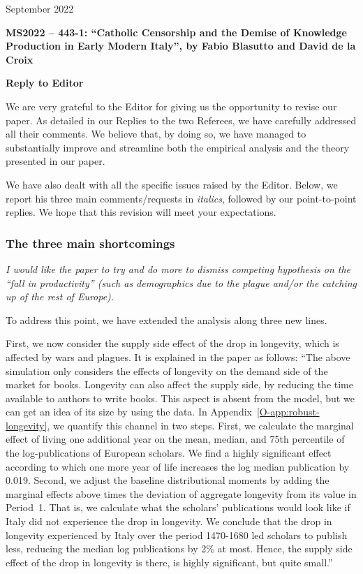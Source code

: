 \documentclass[12pt]{article}
\begin{document}
\hfill September 2022

\textbf{MS2022 – 443-1: “Catholic Censorship and the Demise of Knowledge Production in
Early Modern Italy”, by Fabio Blasutto and David de la Croix}


\textbf{Reply to Editor}

We are very grateful to the Editor for giving us the opportunity to revise our paper.
As detailed in our Replies to the two Referees, we have carefully addressed all their comments. We believe that, by doing so, we have managed to substantially improve and streamline both the empirical analysis and the theory presented in our paper.

We have also dealt with all the specific issues raised by the Editor. Below, we report his three main comments/requests in \emph{italics}, followed by our point-to-point replies.
We hope that this revision will meet your expectations.

\subsubsection*{The three main shortcomings}

\textit{I
would like the paper to try and do more to dismiss competing hypothesis on the “fall in
productivity” (such as demographics due to the plague and/or the catching up of the rest
of Europe).}

To address this point, we have extended the analysis along three new lines. 

First, we now consider the supply side effect of the drop in longevity, which is affected by wars and plagues. It is explained in the paper as follows:
``The above simulation only considers the effects of longevity on the demand side of the market for books. Longevity can also affect the supply side, by reducing the time available to authors to write books. This aspect is absent from the model, but we can get an idea of its size by using the data. In Appendix~\ref{O-app:robust-longevity}, we quantify this channel  in two steps. First, we calculate the marginal effect of living one additional year on the mean, median, and 75th percentile of the log-publications of European scholars. We find a highly significant effect according to which one more year of life increases the log median publication by 0.019.
Second, we adjust the baseline distributional moments by adding the marginal effects above times the deviation of aggregate longevity from its value in Period~1.
That is, we calculate what the scholars' publications would look like if Italy did not experience the drop in longevity. We conclude that the drop in longevity experienced by Italy over the period 1470-1680 led scholars to  publish less, reducing the median log publications by 2\% at most. Hence, the supply side effect of the drop in longevity is there, is highly significant, but quite small.''
\end{document}
